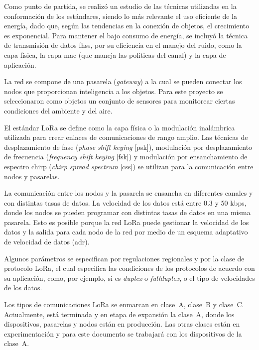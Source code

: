 Como punto de partida, se realizó un estudio de las técnicas utilizadas en la conformación de los estándares, siendo lo más relevante el uso eficiente de la energía, dado que, según las tendencias en la conexión de objetos, el crecimiento es exponencial. Para mantener el bajo consumo de energía, se incluyó la técnica de transmisión de datos \gls{fhss}, por su eficiencia en el manejo del ruido, como la capa física, la capa \gls{mac} (que maneja las políticas del canal) y la capa de aplicación. 

La red se compone de una pasarela (\emph{gateway}) a la cual se pueden conectar los nodos que proporcionan inteligencia a los objetos. Para este proyecto se seleccionaron como objetos un conjunto de sensores para monitorear ciertas condiciones del ambiente y del aire.

El estándar LoRa se define como la capa física o la modulación inalámbrica utilizada para crear enlaces de comunicaciones de rango amplio. Las técnicas de desplazamiento de fase (\emph{phase shift keying} [\gls{psk}]), modulación por desplazamiento de frecuencia (\emph{frequency shift keying} [\gls{fsk}]) y modulación por ensanchamiento de espectro chirp (\emph{chirp spread spectrum} [\gls{css}]) se utilizan para la comunicación entre nodos y pasarelas.

La comunicación entre los nodos y la pasarela se ensancha en diferentes canales y con distintas tasas de datos. La velocidad de los datos está entre 0.3 y 50 kbps, donde los nodos se pueden programar con distintas tasas de datos en una misma pasarela. Esto es posible porque la red LoRa puede gestionar la velocidad de los datos y la salida para cada nodo de la red por medio de un esquema adaptativo de velocidad de datos (\gls{adr}).

Algunos parámetros se especifican por regulaciones regionales y por la clase de protocolo LoRa, el cual especifica las condiciones de los protocolos de acuerdo con su aplicación, como, por ejemplo, si es \emph{duplex} o \emph{fullduplex}, o el tipo de velocidades de los datos.

Los tipos de comunicaciones LoRa se enmarcan en clase~A, clase~B y clase~C. Actualmente, está terminada y en etapa de expansión la clase~A, donde los dispositivos, pasarelas y nodos están en producción. Las otras clases están en experimentación y para este documento se trabajará con los dispositivos de la clase~A.

